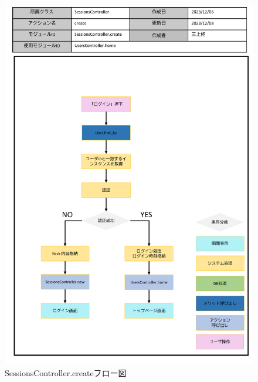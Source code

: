 \begin{figure}
    \centering
    \includegraphics[scale=0.6]{img/Sessions/pptx/SessionsController_create.pdf}
    \caption{SessionsController.createフロー図}
\end{figure}
\clearpage 
